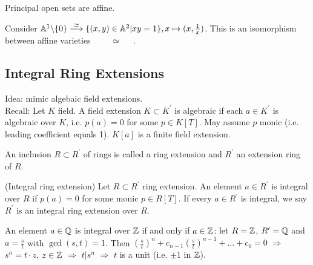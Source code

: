 \documentclass[a4paper,11pt]{article}
\begin{document}
{					\begin{remark}
						Principal open sets are affine.
					\end{remark}

					\begin{eg}
						Consider $\AA^1\backslash\{0\}\overset{\simeq}{\longrightarrow}\{(x,y)\in\AA^2|xy=1\}, x\mapsto(x,\frac{1}{x})$. This is an isomorphism between affine varieties\ \   $\quad\simeq\quad$ .
					\end{eg}

			}



		\subsection{Integral Ring Extensions}

			\noindent Idea: mimic algebaic field extensions.
			\\

			\noindent Recall: Let $K$ field. A field extension $K\subset K^\prime$ is algebraic if each $a\in K^\prime$ is algebraic over $K$, i.e. $p(a)=0$ for some $p\in K[T]$. May assume $p$ monic (i.e. leading coefficient equals 1). $K[a]$ is a finite field extension.

			\begin{defi}
				An inclusion $R\subset R^\prime$ of rings is called a ring extension and $R^\prime$ an extension ring of $R$.
			\end{defi}

			\begin{defi}(Integral ring extension)
				Let $R\subset R^\prime$ ring extension. An element $a\in R^\prime$ is integral over $R$ if $p(a)=0$ for some monic $p\in R[T]$. If every $a\in R^\prime$ is integral, we say $R^\prime$ is an integral ring extension over $R$.
			\end{defi}

			\begin{eg}
				An element $a\in\Q$ is integral over $\Z$ if and only if $a\in\Z$: let $R=\Z$, $R^\prime=\Q$ and $a=\frac{s}{t}$ with $\gcd(s,t)=1$. Then $\left(\frac{s}{t}\right)^n+c_{n-1}\left(\frac{s}{t}\right)^{n-1}+\dots+c_0=0$ $\Longrightarrow$ $s^n=t\cdot z$, $z\in\Z$ $\Longrightarrow$ $t|s^n$ $\Longrightarrow$ $t$ is a unit (i.e. $\pm 1$ in $\Z$).
			\end{eg}
\end{document}
